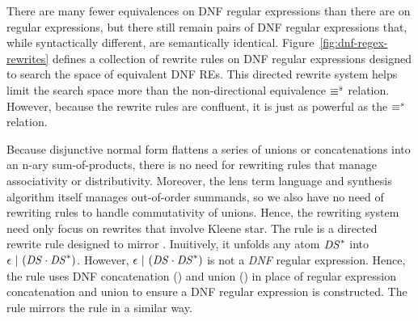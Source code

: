 \documentclass[acmsmall]{acmart}
\begin{document}
There are many fewer equivalences on DNF regular expressions than there are on
regular expressions, but there
still remain pairs of DNF regular expressions that, while syntactically different,
are semantically identical.  
Figure~\ref{fig:dnf-regex-rewrites} defines a collection of rewrite rules on DNF regular expressions
designed to search the space of equivalent DNF REs.  
This directed rewrite system helps limit
the search space more than the non-directional equivalence $\equiv^s$ relation.
However, because the rewrite rules are confluent, it is just as powerful as the
$\equiv^s$ relation.
 

Because disjunctive normal form flattens a series of unions or concatenations
into an n-ary sum-of-products,
there is no need for rewriting rules that manage associativity or
distributivity.  Moreover, the lens term language and synthesis algorithm itself manages out-of-order summands, so we also have no need of rewriting
rules to handle commutativity of unions.  Hence, the rewriting system
need only focus on rewrites that involve Kleene star.
The rule \AtomUnrollstarLeftRule{} is a directed rewrite rule
designed to mirror \UnrollstarLeftRule{}.  Inuitively, it unfolds any atom 
${\mathit{DS}{}}^*$ into $\epsilon{}~|~(\mathit{DS}{}\cdot{{\ensuremath{\mathit{DS}}{}}}^*)$.  However, 
$\epsilon{}~|~(\mathit{DS}{}\cdot{{\ensuremath{\mathit{DS}}{}}}^*)$ is
not a \emph{DNF} regular expression.  Hence, the rule uses DNF concatenation (\ConcatDNF)
and union (\OrDNF) in place of regular expression concatenation and union
to ensure a DNF regular expression is constructed.  The rule
\AtomUnrollstarRightRule{} mirrors the rule \UnrollstarRightRule{} in 
a similar way.
\end{document}

